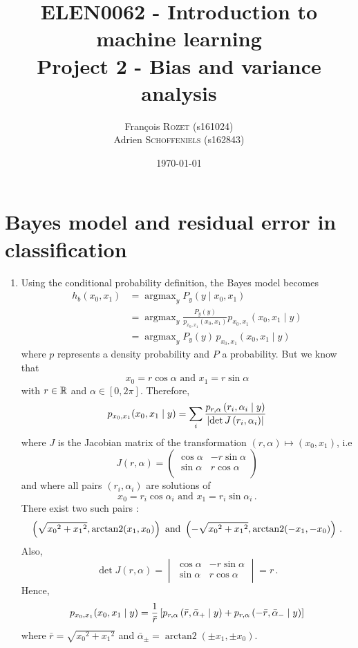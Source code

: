 \documentclass[a4paper, 12pt]{article}
\title{\vspace{-2cm}\textsc{ELEN0062} - Introduction to machine learning\\Project 2 - Bias and variance analysis}
\author{
François \textsc{Rozet} (s161024)\\
Adrien \textsc{Schoffeniels} (s162843)\\
}
\date{\today}
\DeclareMathOperator{\argmax}{argmax}
\DeclareMathOperator{\arctantwo}{arctan2}
\begin{document}
	\maketitle
	
	\section{Bayes model and residual error in classification}
	\begin{enumerate}[label = (\alph*)]
	    \item Using the conditional probability definition, the Bayes model becomes
    	\begin{align*}
    	    h_b(x_0, x_1) & = \argmax_y P_{y}(y \mid x_0, x_1) \\
    	    & = \argmax_y \frac{P_y(y)}{p_{x_0,x_1}(x_0, x_1)} p_{x_0,x_1}(x_0, x_1 \mid y) \\
    	    & = \argmax_y P_{y}(y) \, p_{x_0,x_1}(x_0, x_1 \mid y)
    	\end{align*}
    	where $p$ represents a density probability and $P$ a probability.
    	But we know that $$x_0 = r \cos \alpha \text{ and } x_1 = r \sin \alpha$$ with $r \in \mathbb{R}$ and $\alpha \in [0, 2\pi]$. Therefore, $$ p_{x_0, x_1}(x_0, x_1 \mid y) = \sum_{i} \frac{p_{r, \alpha}\left(r_i, \alpha_i \mid y\right)}{\left|\det J\left(r_i, \alpha_i\right)\right|} $$ where $J$ is the Jacobian matrix of the transformation $(r, \alpha) \mapsto (x_0, x_1)$, i.e
    	$$
    	J(r, \alpha) =
    	\begin{pmatrix}
    	    \cos \alpha & -r \sin \alpha \\
    	    \sin \alpha & r \cos \alpha \\
    	\end{pmatrix}
    	$$ and where all pairs $(r_i, \alpha_i)$ are solutions of $$x_0 = r_i \cos \alpha_i \text{ and } x_1 = r_i \sin \alpha_i \, .$$
    	There exist two such pairs : $$\rbk{\sqrt{{x_0}^2 + {x_1}^2}, \arctantwo(x_1, x_0)} \text{ and } \rbk{-\sqrt{{x_0}^2 + {x_1}^2}, \arctantwo(-x_1, -x_0)} \, .$$
    	Also,
    	$$
    	\det J(r, \alpha) =
    	\begin{vmatrix}
    	    \cos \alpha & -r \sin \alpha \\
    	    \sin \alpha & r \cos \alpha \\
    	\end{vmatrix}
    	= r \, .
    	$$
    	Hence, $$ p_{x_0, x_1}(x_0, x_1 \mid y) = \frac{1}{\bar{r}} \left[p_{r, \alpha}\left(\bar{r}, \bar{\alpha}_+ \mid y\right) + p_{r, \alpha}\left(-\bar{r}, \bar{\alpha}_- \mid y\right)\right] $$
    	where $\bar{r} = \sqrt{{x_0}^2 + {x_1}^2}$ and $\bar{\alpha}_\pm =  \arctantwo(\pm x_1, \pm x_0)$.


\end{enumerate}
\end{document}
